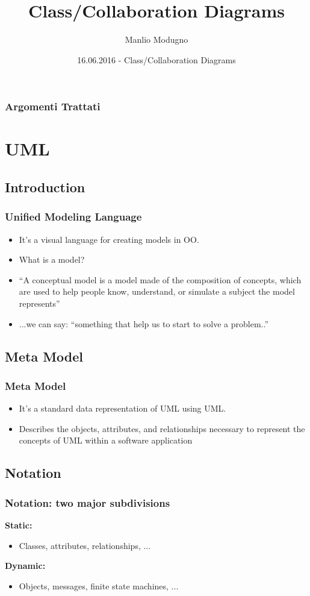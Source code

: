 \documentclass{beamer}
\title{Class/Collaboration Diagrams}
\author{Manlio Modugno}
\institute[GMTechnologies]
\date[16.06.2016] 
{16.06.2016 - Class/Collaboration Diagrams}
\begin{document}
\begin{frame}
  \titlepage
\end{frame}

\begin{frame}
  \frametitle{Argomenti Trattati}
  \tableofcontents
\end{frame}

\section{UML}
\subsection{Introduction}
\begin{frame}
	\frametitle{Unified Modeling Language}	
	\begin{itemize}
  		\item<+-> It's a visual language for creating models in OO.
		\item<+-> What is a model?  
		\item<+-> ``A conceptual model is a model made of the composition of concepts, which are used to help people know, understand, or simulate a subject the model represents''
		\item<+-> ...we can say: ``something that help us to start to solve a problem..''		
	\end{itemize}
\end{frame}

\subsection{Meta Model}
\begin{frame}
	\frametitle{Meta Model}
	\begin{itemize}
  			\item<+-> It's a standard data representation of UML using UML.
  			\item<+-> Describes the objects, attributes, and relationships necessary to represent the concepts of UML within a software application
	\end{itemize}
\end{frame}

\subsection{Notation}
\begin{frame}
	\frametitle{Notation: two major subdivisions}
	\textbf{Static:}
	\begin{itemize}
  			\item Classes, attributes, relationships, ...
	\end{itemize}
	\textbf{Dynamic:}
	\begin{itemize}
  			\item Objects, messages, finite state machines, ...
	\end{itemize}
\end{frame}
\end{document}
